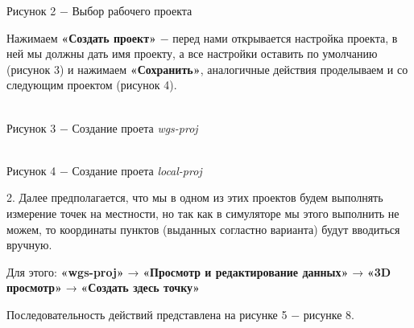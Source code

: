 \documentclass[a4paper]{article}
\begin{document}
{\begin{center}
    Рисунок 2 $-$ Выбор рабочего проекта
\end{center}
\par Нажимаем \textbf{«Создать проект»} $-$ перед нами открывается настройка проекта, в ней мы должны дать имя проекту, а все настройки оставить по умолчанию (рисунок 3) и нажимаем \textbf{«Сохранить»}, аналогичные действия проделываем и со следующим проектом (рисунок 4).
\begin{center}
    \\
    Рисунок 3 $-$ Создание проета \textit{wgs-proj} 
\end{center}
\begin{center}
     \\
    Рисунок 4 $-$ Создание проета \textit{local-proj} 
\end{center}
\par 2. Далее предполагается, что мы в одном из этих проектов будем выполнять измерение точек на местности, но так как в симуляторе мы этого выполнить не можем, то координаты пунктов (выданных согластно варианта) будут вводиться вручную. 
\par Для этого: \textbf{«wgs-proj»} → \textbf{«Просмотр и редактирование данных»} → \textbf{«3D просмотр»} → \textbf{«Создать здесь точку»}
\par Последовательность действий представлена на рисунке 5 $-$ рисунке 8.
}
\end{document}
